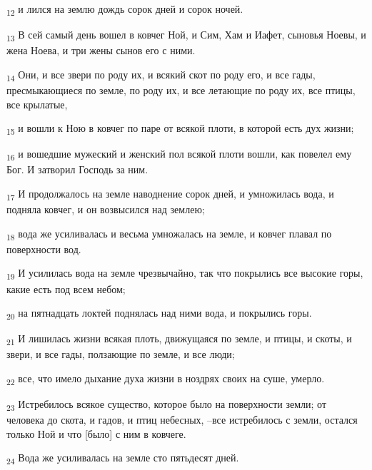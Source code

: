 \begin{tcolorbox}
\textsubscript{12} и лился на землю дождь сорок дней и сорок ночей.
\end{tcolorbox}
\begin{tcolorbox}
\textsubscript{13} В сей самый день вошел в ковчег Ной, и Сим, Хам и Иафет, сыновья Ноевы, и жена Ноева, и три жены сынов его с ними.
\end{tcolorbox}
\begin{tcolorbox}
\textsubscript{14} Они, и все звери по роду их, и всякий скот по роду его, и все гады, пресмыкающиеся по земле, по роду их, и все летающие по роду их, все птицы, все крылатые,
\end{tcolorbox}
\begin{tcolorbox}
\textsubscript{15} и вошли к Ною в ковчег по паре от всякой плоти, в которой есть дух жизни;
\end{tcolorbox}
\begin{tcolorbox}
\textsubscript{16} и вошедшие мужеский и женский пол всякой плоти вошли, как повелел ему Бог. И затворил Господь за ним.
\end{tcolorbox}
\begin{tcolorbox}
\textsubscript{17} И продолжалось на земле наводнение сорок дней, и умножилась вода, и подняла ковчег, и он возвысился над землею;
\end{tcolorbox}
\begin{tcolorbox}
\textsubscript{18} вода же усиливалась и весьма умножалась на земле, и ковчег плавал по поверхности вод.
\end{tcolorbox}
\begin{tcolorbox}
\textsubscript{19} И усилилась вода на земле чрезвычайно, так что покрылись все высокие горы, какие есть под всем небом;
\end{tcolorbox}
\begin{tcolorbox}
\textsubscript{20} на пятнадцать локтей поднялась над ними вода, и покрылись горы.
\end{tcolorbox}
\begin{tcolorbox}
\textsubscript{21} И лишилась жизни всякая плоть, движущаяся по земле, и птицы, и скоты, и звери, и все гады, ползающие по земле, и все люди;
\end{tcolorbox}
\begin{tcolorbox}
\textsubscript{22} все, что имело дыхание духа жизни в ноздрях своих на суше, умерло.
\end{tcolorbox}
\begin{tcolorbox}
\textsubscript{23} Истребилось всякое существо, которое было на поверхности земли; от человека до скота, и гадов, и птиц небесных, --все истребилось с земли, остался только Ной и что [было] с ним в ковчеге.
\end{tcolorbox}
\begin{tcolorbox}
\textsubscript{24} Вода же усиливалась на земле сто пятьдесят дней.
\end{tcolorbox}
